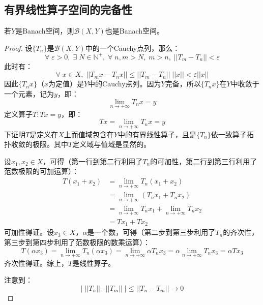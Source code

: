 \subsection{有界线性算子空间的完备性}
\begin{theorem}
	若$Y$是Banach空间，则$\mathscr{B}(X,Y)$也是Banach空间。
\end{theorem}
\begin{proof}
	设$\{T_n\}$是$\mathscr{B}(X,Y)$中的一个Cauchy点列，那么：
	\begin{equation*}
		\forall\;\varepsilon>0,\;\exists\;N\in\mathbb{N}^+,\;\forall\;n,m>N,\;m>n,\;||T_m-T_n||<\varepsilon
	\end{equation*}	
	此时有：
	\begin{equation*}
		\forall\;x\in X,\;||T_mx-T_nx||\leqslant||T_m-T_n||\;||x||<\varepsilon||x||
	\end{equation*}
	因此$\{T_nx\}$（$x$为定值）是$Y$中的Cauchy点列。因为$Y$完备，所以$\{T_nx\}$在$Y$中收敛于一个元素，记为$y$，即：
	\begin{equation*}
		\lim_{n\to+\infty}T_nx=y
	\end{equation*}
	定义算子$T:Tx=y$，即：
	\begin{equation*}
		Tx=\lim_{n\to+\infty}T_nx=y
	\end{equation*}
	下证明$T$是定义在$X$上而值域包含在$Y$中的有界线性算子，且是$\{T_n\}$依一致算子拓扑收敛的极限。其中$T$定义域与值域是显然的。\par
	设$x_1,x_2\in X$，可得（第一行到第二行利用了$T_n$的可加性，第二行到第三行利用了范数极限的可加运算）：
	\begin{align*}
		T(x_1+x_2)&=\lim_{n\to+\infty}T_n(x_1+x_2) \\
		&=\lim_{n\to+\infty}(T_nx_1+T_nx_2) \\
		&=\lim_{n\to+\infty}T_nx_1+\lim_{n\to+\infty}T_nx_2 \\
		&=Tx_1+Tx_2
	\end{align*}
	可加性得证。设$x_3\in X$，$\alpha$是一个数，可得（第二步到第三步利用了$T_n$的齐次性，第三步到第四步利用了范数极限的数乘运算）：
	\begin{equation*}
		T(\alpha x_3)=\lim_{n\to+\infty}T_n(\alpha x_3)=\lim_{n\to+\infty}\alpha T_nx_3=\alpha\lim_{n\to+\infty}T_nx_3=\alpha Tx_3
	\end{equation*}
	齐次性得证。综上，$T$是线性算子。\par
	注意到：
	\begin{equation*}
		|\;||T_n||-||T_m||\;|\leqslant||T_n-T_m||\to0
	\end{equation*}

\end{proof}
